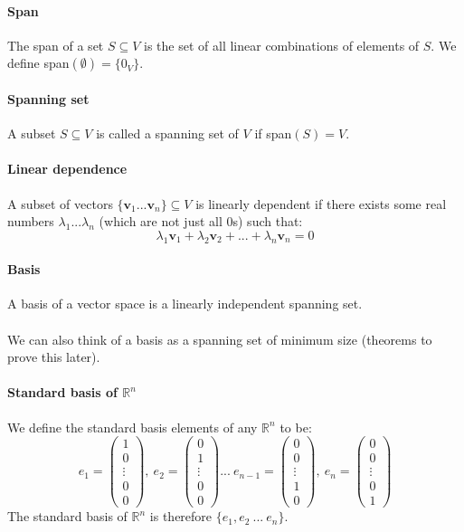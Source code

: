 \documentclass{article}
\newcommand{\R}{\mathbb{R}}
\renewcommand{\vec}[1]{\mathbf{#1}}
\begin{document}
\paragraph{Span}
The span of a set $ S \subseteq V $ is the set of all linear combinations of elements of $ S $. We define span$ (\emptyset) = \{0_{V}\} $.
\paragraph{Spanning set}
A subset $ S \subseteq V $ is called a spanning set of $ V $ if span$ (S) = V $.
\paragraph{Linear dependence}
A subset of vectors $ \{ \vec{v}_{1}...\vec{v}_{n} \}  \subseteq V $ is linearly dependent if there exists some real numbers $ \lambda_{1}...\lambda_{n} $ (which are not just all $ 0 $s) such that:
\begin{equation}
\lambda_{1}\vec{v}_{1} + \lambda_{2}\vec{v}_{2} + ... + \lambda_{n}\vec{v}_{n} = 0
\end{equation}
\paragraph{Basis}
A basis of a vector space is a linearly independent spanning set.
\\\\
We can also think of a basis as a spanning set of minimum size (theorems to prove this later).
\paragraph{Standard basis of $ \R^{n} $}
We define the standard basis elements of any $ \R^{n} $ to be:
\begin{equation}
e_{1} = 
\begin{pmatrix}
1 \\ 0 \\ \vdots \\ 0 \\ 0
\end{pmatrix} , \ 
e_{2} = 
\begin{pmatrix}
0 \\ 1 \\ \vdots \\ 0 \\ 0
\end{pmatrix} ... \
e_{n-1} = 
\begin{pmatrix}
0 \\ 0 \\ \vdots \\ 1 \\ 0
\end{pmatrix} , \
e_{n} = 
\begin{pmatrix}
0 \\ 0 \\ \vdots \\ 0 \\ 1
\end{pmatrix}
\end{equation}
The standard basis of $ \R^{n} $ is therefore $ \{e_{1}, e_{2} \ ... \ e_{n} \} $.
\end{document}
